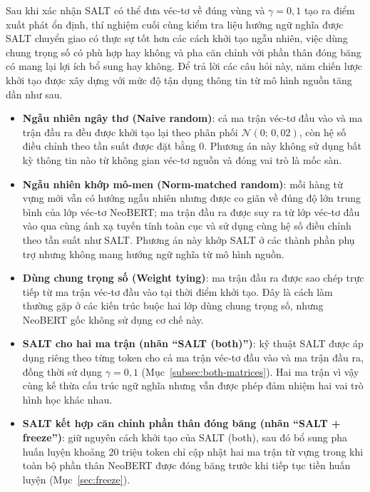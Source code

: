 Sau khi xác nhận SALT có thể đưa véc-tơ về đúng vùng và $\gamma = 0{,}1$ tạo ra điểm
xuất phát ổn định, thí nghiệm cuối cùng kiểm tra liệu hướng ngữ nghĩa được SALT chuyển
giao có thực sự tốt hơn các cách khởi tạo ngẫu nhiên, việc dùng chung trọng số có phù hợp
hay không và pha căn chỉnh với phần thân đóng băng có mang lại lợi ích bổ sung hay không.
Để trả lời các câu hỏi này, năm chiến lược khởi tạo được xây dựng với mức độ tận dụng
thông tin từ mô hình nguồn tăng dần như sau.

\begin{itemize}
  \item \textbf{Ngẫu nhiên ngây thơ (Naive random)}: cả ma trận véc-tơ đầu vào và ma trận
        đầu ra đều được khởi tạo lại theo phân phối $\mathcal{N}(0;\,0{,}02)$, còn hệ số
        điều chỉnh theo tần suất được đặt bằng 0. Phương án này không sử dụng bất kỳ thông
        tin nào từ không gian véc-tơ nguồn và đóng vai trò là mốc sàn.
  \item \textbf{Ngẫu nhiên khớp mô-men (Norm-matched random)}: mỗi hàng từ vựng mới vẫn
        có hướng ngẫu nhiên nhưng được co giãn về đúng độ lớn trung bình của lớp véc-tơ
        NeoBERT; ma trận đầu ra được suy ra từ lớp véc-tơ đầu vào qua cùng ánh xạ tuyến
        tính toàn cục và sử dụng cùng hệ số điều chỉnh theo tần suất như SALT. Phương án
        này khớp SALT ở các thành phần phụ trợ nhưng không mang hướng ngữ nghĩa từ mô hình
        nguồn.
  \item \textbf{Dùng chung trọng số (Weight tying)}: ma trận đầu ra được sao chép trực
        tiếp từ ma trận véc-tơ đầu vào tại thời điểm khởi tạo. Đây là cách làm thường gặp
        ở các kiến trúc buộc hai lớp dùng chung trọng số, nhưng NeoBERT gốc không sử dụng
        cơ chế này.
  \item \textbf{SALT cho hai ma trận (nhãn ``SALT (both)'')}: kỹ thuật SALT được áp dụng
        riêng theo từng token cho cả ma trận véc-tơ đầu vào và ma trận đầu ra, đồng thời
        sử dụng $\gamma = 0{,}1$ (Mục~\ref{subsec:both-matrices}). Hai ma trận vì vậy
        cùng kế thừa cấu trúc ngữ nghĩa nhưng vẫn được phép đảm nhiệm hai vai trò hình học
        khác nhau.
  \item \textbf{SALT kết hợp căn chỉnh phần thân đóng băng (nhãn ``SALT + freeze'')}:
        giữ nguyên cách khởi tạo của SALT (both), sau đó bổ sung pha huấn luyện khoảng
        20 triệu token chỉ cập nhật hai ma trận từ vựng trong khi toàn bộ phần thân
        NeoBERT được đóng băng trước khi tiếp tục tiền huấn luyện
        (Mục~\ref{sec:freeze}).
\end{itemize}

